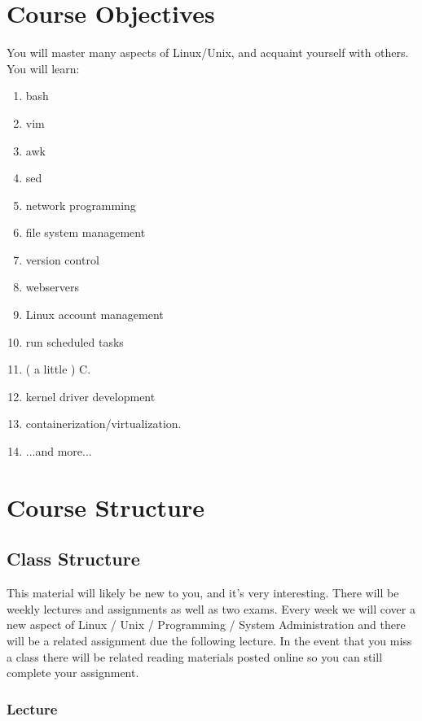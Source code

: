 \documentclass[11pt]{article}
\begin{document}

\section*{Course Objectives}
You will master many aspects of Linux/Unix, and acquaint yourself with others. You will learn:
\begin{multicols}{2}
\begin{enumerate}
\item bash
\item vim
\item awk
\item sed
\item network programming
\item file system management
\item version control
\item webservers
\item Linux account management
\item run scheduled tasks
\item ( a little ) C.
\item kernel driver development
\item containerization/virtualization.
\item ...and more...
\end{enumerate}
\end{multicols}


\section*{Course Structure}

\subsection*{Class Structure}

This material will likely be new to you, and it's very interesting. There will be weekly lectures and assignments as well as two exams. Every week we will cover a new aspect of Linux / Unix / Programming / System Administration and there will be a related assignment due the following lecture. In the event that you miss a class there will be related reading materials posted online so you can still complete your assignment.

\subsubsection*{Lecture}
\end{document}
